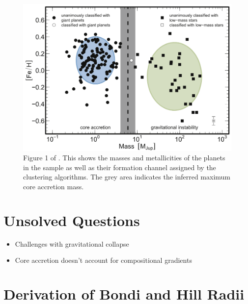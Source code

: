 \documentclass[twocolumn]{aastex631}
\newcommand{\placeholder}[1]{{\color{gray} \lipsum[#1]}}
\begin{document}
\begin{figure}
    \centering
    \includegraphics[width=\columnwidth]{max_core_acc_mass.png}
    \caption{Figure 1 of \citet{Schlaufman+2018}. This shows the masses and metallicities of the planets in the sample as well as their formation channel assigned by the clustering algorithms. The grey area indicates the inferred maximum core accretion mass.}
    \label{fig:max_mass}
\end{figure}

\section{Unsolved Questions}

\placeholder{1-3}

\begin{itemize}
    \item Challenges with gravitational collapse \citep{Forgan+2013}
    \item Core accretion doesn't account for compositional gradients \citep{D'Angelo+2018}
\end{itemize}



{}

\appendix

\section{Derivation of Bondi and Hill Radii}\label{app:maths}
\end{document}
